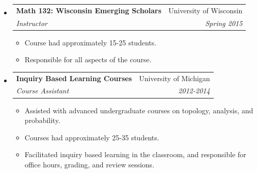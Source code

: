 \documentclass[letterpaper,11pt]{article}
\makeatletter
\newcommand{\resitem}[1]{\item #1 \vspace{-2pt}}
\newcommand{\ressubheading}[4]{
\begin{tabular*}{6.5in}[t]{l@{\cftdotfill{\cftsecdotsep}\extracolsep{\fill}}r}
		\textbf{#1} & #2 \\
		\textit{#3} & \textit{#4} \\
\end{tabular*}\vspace{-6pt}}
\makeatother
\begin{document}
\begin{itemize}
\item 
	\ressubheading{Math 132: Wisconsin Emerging Scholars}{University of Wisconsin}{Instructor}{Spring 2015}
	\begin{itemize}
		\resitem{Course had approximately 15-25 students.}
		\resitem{Responsible for all aspects of the course.}
	\end{itemize}

\item 
	\ressubheading{Inquiry Based Learning Courses}{University of Michigan}{Course Assistant}{2012-2014}
		\begin{itemize}
		\resitem{Assisted with advanced undergraduate courses on topology, analysis, and probability. }
		\resitem{Courses had approximately 25-35 students.}
		\resitem{Facilitated inquiry based learning in the classroom, and responsible for office hours, grading, and review sessions.}
		\end{itemize}
%
%
%
%
%
%
%	
%

\end{itemize}
\end{document}
